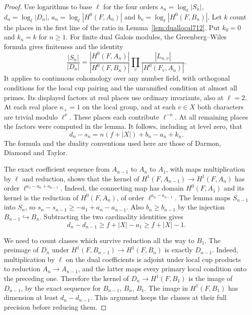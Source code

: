 \documentclass[a4paper,11pt]{article}
\theoremstyle{definition}
\theoremstyle{remark}
\numberwithin{equation}{section}
\begin{document}
\begin{proof}
Use logarithms to base \(\ell\) for the four orders
\(s_n=\log_\ell|S_n|\), \(d_n=\log_\ell|D_n|\),
\(a_n=\log_\ell|H^0(F,A_n)|\) and \(b_n=\log_\ell|H^0(F,B_n)|\).
Let \(k\) count the places in the first line of the ratio in
Lemma~\ref{lem:duallocal712}. Put \(k_0=0\) and \(k_n=k\) for
\(n\ge1\). For finite dual Galois modules, the Greenberg--Wiles
formula gives finiteness and the identity
\[
  \frac{|S_n|}{|D_n|}
  =\frac{|H^0(F,A_n)|}{|H^0(F,B_n)|}
   \prod_v\frac{|L_{n,v}|}{|H^0(F_v,A_n)|}.
\]
It applies to continuous cohomology over any number field, with
orthogonal conditions for the local cup pairing and the unramified
condition at almost all primes. Its displayed factors at real
places use ordinary invariants, also at \(\ell=2\).
At each real place \(\kappa_+=1\) on the local group, and
at each \(v\in X\) both characters are trivial modulo
\(\ell^\nu\). These places each contribute \(\ell^{-n}\).
At all remaining places the factors were computed in the lemma.
It follows, including at level zero, that
\[
 d_n-s_n=n(f+|X|)+b_n-a_n+k_n .
\]
The formula and the duality conventions used here are those
of Darmon, Diamond and Taylor.~\cite{II-II-II-gw712}

The exact coefficient sequence from \(A_{n-1}\) to \(A_n\)
to \(A_1\), with maps multiplication by \(\ell\) and reduction,
shows that the kernel of
\(H^1(F,A_{n-1})\longrightarrow H^1(F,A_n)\) has order
\(\ell^{a_1-a_n+a_{n-1}}\). Indeed, the connecting map has
domain \(H^0(F,A_1)\) and its kernel is the reduction of
\(H^0(F,A_n)\), of order \(\ell^{a_n-a_{n-1}}\).
The lemma maps \(S_{n-1}\) into \(S_n\), so
\(s_n-s_{n-1}\ge-a_1+a_n-a_{n-1}\). Also \(b_n\ge b_{n-1}\)
by the injection \(B_{n-1}\hookrightarrow B_n\). Subtracting
the two cardinality identities gives
\[
                  d_n-d_{n-1}\ge f+|X|-a_1\ge f+|X|-1 .
\]

We need to count classes which survive reduction all the way
to \(B_1\). The preimage of \(D_n\) under
\(H^1(F,B_{n-1})\to H^1(F,B_n)\) is exactly \(D_{n-1}\).
Indeed, multiplication by \(\ell\) on the dual coefficients
is adjoint under local cup products to reduction
\(A_n\to A_{n-1}\), and the latter maps every primary local
condition onto the preceding one. Therefore the kernel of
\(D_n\to H^1(F,B_1)\) is the image of \(D_{n-1}\), by the
exact sequence for \(B_{n-1}\), \(B_n\), \(B_1\). The image
in \(H^1(F,B_1)\) has dimension at least \(d_n-d_{n-1}\).
This argument keeps the classes at their full precision before
reducing them.


\end{proof}
\end{document}
